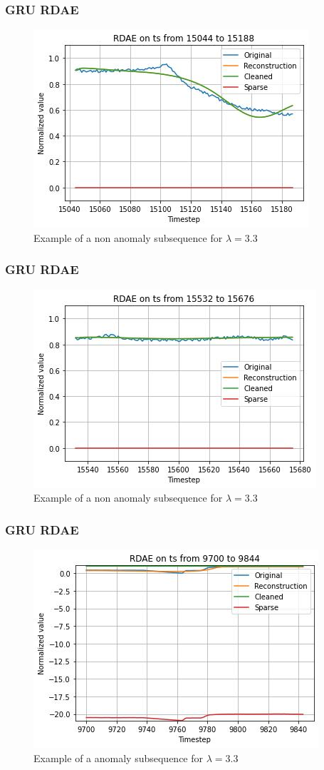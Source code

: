 \documentclass{beamer}
\theoremstyle{plain}
\theoremstyle{definition}
\theoremstyle{remark}
\begin{document}
\begin{frame}
	\frametitle{GRU RDAE}
	\begin{figure}
		\centering
		\includegraphics[width=0.7\linewidth]{Images/GRUlam3.3ts_non_anomalyzoom15044.jpg}
		\caption[]{Example of a non anomaly subsequence for $\lambda=3.3$}
	\end{figure}
\end{frame}

\begin{frame}
	\frametitle{GRU RDAE}
	\begin{figure}
		\centering
		\includegraphics[width=0.7\linewidth]{Images/GRUlam3.3ts_non_anomalyzoom15532.jpg}
		\caption[]{Example of a non anomaly subsequence for $\lambda=3.3$}
	\end{figure}
\end{frame}

\begin{frame}
	\frametitle{GRU RDAE}
	\begin{figure}
		\centering
		\includegraphics[width=0.7\linewidth]{Images/GRUlam3.3ts_anomaly9700.jpg}
		\caption[]{Example of a anomaly subsequence for $\lambda=3.3$}
	\end{figure}
\end{frame}
\end{document}
